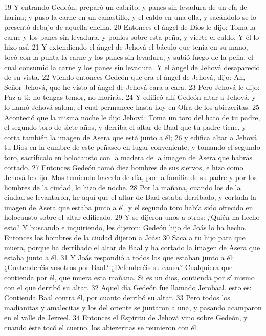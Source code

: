 19 Y entrando Gedeón, preparó un cabrito, y panes sin levadura de un efa   de harina; y puso la carne en un canastillo, y el caldo en una olla, y sacándolo se lo presentó debajo de aquella encina.
20 Entonces el ángel de Dios le dijo: Toma la carne y los panes sin levadura, y ponlos sobre esta peña, y vierte el caldo. Y él lo hizo así.
21 Y extendiendo el ángel de Jehová el báculo que tenía en su mano, tocó con la punta la carne y los panes sin levadura; y subió fuego de la peña, el cual consumió la carne y los panes sin levadura. Y el ángel de Jehová desapareció de su vista.
22 Viendo entonces Gedeón que era el ángel de Jehová, dijo: Ah, Señor Jehová, que he visto al ángel de Jehová cara a cara. 
23 Pero Jehová le dijo: Paz a ti; no tengas temor, no morirás.
24 Y edificó allí Gedeón altar a Jehová, y lo llamó Jehová-salom; el cual permanece hasta hoy en Ofra de los abiezeritas.
25 Aconteció que la misma noche le dijo Jehová: Toma un toro del hato de tu padre, el segundo toro de siete años, y derriba el altar de Baal que tu padre tiene, y corta también la imagen de Asera que está junto a él;
26 y edifica altar a Jehová tu Dios en la cumbre de este peñasco en lugar conveniente; y tomando el segundo toro, sacrifícalo en holocausto con la madera de la imagen de Asera que habrás cortado.
27 Entonces Gedeón tomó diez hombres de sus siervos, e hizo como Jehová le dijo. Mas temiendo hacerlo de día, por la familia de su padre y por los hombres de la ciudad, lo hizo de noche.
28 Por la mañana, cuando los de la ciudad se levantaron, he aquí que el altar de Baal estaba derribado, y cortada la imagen de Asera que estaba junto a él, y el segundo toro había sido ofrecido en holocausto sobre el altar edificado.
29 Y se dijeron unos a otros: ¿Quién ha hecho esto? Y buscando e inquiriendo, les dijeron: Gedeón hijo de Joás lo ha hecho. Entonces los hombres de la ciudad dijeron a Joás:
30 Saca a tu hijo para que muera, porque ha derribado el altar de Baal y ha cortado la imagen de Asera que estaba junto a él.
31 Y Joás respondió a todos los que estaban junto a él: ¿Contenderéis vosotros por Baal? ¿Defenderéis su causa? Cualquiera que contienda por él, que muera esta mañana. Si es un dios, contienda por sí mismo con el que derribó su altar.
32 Aquel día Gedeón fue llamado Jerobaal, esto es: Contienda Baal contra él, por cuanto derribó su altar.
33 Pero todos los madianitas y amalecitas y los del oriente se juntaron a una, y pasando acamparon en el valle de Jezreel.
34 Entonces el Espíritu de Jehová vino sobre Gedeón, y cuando éste tocó el cuerno, los abiezeritas se reunieron con él.
